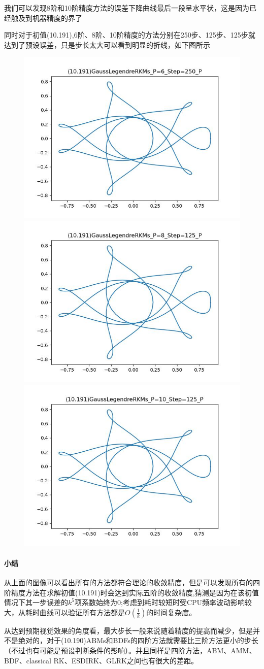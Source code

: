 \documentclass{article}
\begin{document}
我们可以发现8阶和10阶精度方法的误差下降曲线最后一段呈水平状，这是因为已经触及到机器精度的界了

同时对于初值(10.191),6阶、8阶、10阶精度的方法分别在250步、125步、125步就达到了预设误差，只是步长太大可以看到明显的折线，如下图所示

\newpage

\begin{figure}[h]
    \centering
    \includegraphics[width = 0.32\linewidth]{(10.191)GaussLegendreRKMs_P=6_Step=250_P.jpg}
    \includegraphics[width = 0.32\linewidth]{(10.191)GaussLegendreRKMs_P=8_Step=125_P.jpg}
    \includegraphics[width = 0.32\linewidth]{(10.191)GaussLegendreRKMs_P=10_Step=125_P.jpg}
\end{figure}

\paragraph{小结} 从上面的图像可以看出所有的方法都符合理论的收敛精度，但是可以发现所有的四阶精度方法在求解初值(10.191)时会达到实际五阶的收敛精度,猜测是因为在该初值情况下其一步误差的$k^5$项系数始终为0;考虑到耗时较短时受CPU频率波动影响较大，从耗时曲线可以验证所有方法都是$O(\frac{1}{k})$的时间复杂度。

从达到预期视觉效果的角度看，最大步长一般来说随着精度的提高而减少，但是并不是绝对的，对于(10.190)ABMs和BDFs的四阶方法就需要比三阶方法更小的步长（不过也有可能是预设判断条件的影响）。并且同样是四阶方法，ABM、AMM、BDF、classical RK、ESDIRK、GLRK之间也有很大的差距。
\end{document}

